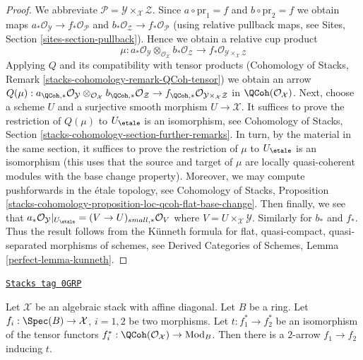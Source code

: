 \begin{proof}
We abbreviate $\mathcal{P} = \mathcal{Y} \times_\mathcal{X} \mathcal{Z}$.
Since $a \circ \text{pr}_1 = f$ and $b \circ \text{pr}_2 = f$
we obtain maps $a_*\mathcal{O}_\mathcal{Y} \to f_*\mathcal{O}_\mathcal{P}$
and $b_*\mathcal{O}_\mathcal{Z} \to f_*\mathcal{O}_\mathcal{P}$ (using
relative pullback maps, see Sites, Section \ref{sites-section-pullback}).
Hence we obtain a relative cup product
$$
\mu :
a_*\mathcal{O}_\mathcal{Y}
\otimes_{\mathcal{O}_\mathcal{X}}
b_*\mathcal{O}_\mathcal{Z} \longrightarrow
f_*\mathcal{O}_{\mathcal{Y} \times_\mathcal{X} \mathcal{Z}}
$$
Applying $Q$ and its compatibility with tensor products
(Cohomology of Stacks, Remark \ref{stacks-cohomology-remark-QCoh-tensor})
we obtain an arrow
$Q(\mu) : a_{\QCoh, *}\mathcal{O}_\mathcal{Y}
\otimes_{\mathcal{O}_\mathcal{X}}
b_{\QCoh, *}\mathcal{O}_\mathcal{Z} \to
f_{\QCoh, *}\mathcal{O}_{\mathcal{Y} \times_\mathcal{X} \mathcal{Z}}$
in $\QCoh(\mathcal{O}_\mathcal{X})$.
Next, choose a scheme $U$ and a surjective smooth morphism
$U \to \mathcal{X}$. It suffices to prove the restriction of
$Q(\mu)$ to $U_\etale$ is an isomorphism, see
Cohomology of Stacks, Section \ref{stacks-cohomology-section-further-remarks}.
In turn, by the material in the same section,
it suffices to prove the restriction of $\mu$ to $U_\etale$
is an isomorphism (this uses that the source and target of $\mu$
are locally quasi-coherent modules with the base change property).
Moreover, we may compute pushforwards in the \'etale topology, see
Cohomology of Stacks, Proposition
\ref{stacks-cohomology-proposition-loc-qcoh-flat-base-change}.
Then finally, we see that
$a_*\mathcal{O}_\mathcal{Y}|_{U_\etale} = (V \to U)_{small, *}\mathcal{O}_V$
where $V = U \times_\mathcal{X} \mathcal{Y}$.
Similarly for $b_*$ and $f_*$. Thus the result follows
from the K\"unneth formula for flat, quasi-compact, quasi-separated
morphisms of schemes, see Derived Categories of Schemes,
Lemma \ref{perfect-lemma-kunneth}.
\end{proof}

\begin{lemma}
\label{stacks-more-morphisms-lemma-fully-faithful}
\href{https://stacks.math.columbia.edu/tag/0GRP}{\texttt{Stacks tag 0GRP}}

Let $\mathcal{X}$ be an algebraic stack with affine diagonal.
Let $B$ be a ring. Let $f_i : \Spec(B) \to \mathcal{X}$, $i = 1, 2$
be two morphisms. Let $t : f_1^* \to f_2^*$ be an isomorphism
of the tensor functors
$f_i^* : \QCoh(\mathcal{O}_\mathcal{X}) \to \text{Mod}_B$.
Then there is a $2$-arrow $f_1 \to f_2$ inducing $t$.
\end{lemma}

